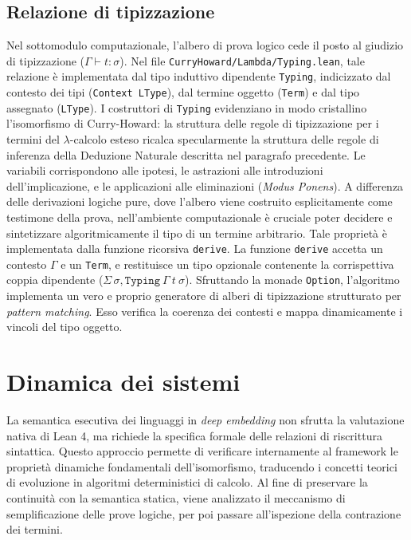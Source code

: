 \subsection{Relazione di tipizzazione}
Nel sottomodulo computazionale, l'albero di prova logico cede il posto al giudizio di tipizzazione (\(\Gamma \vdash t : \sigma\)). Nel file \texttt{CurryHoward/Lambda/Typing.lean}, tale relazione è implementata 
dal tipo induttivo dipendente \texttt{Typing}, indicizzato dal contesto dei tipi (\texttt{Context LType}), dal termine oggetto (\texttt{Term}) e dal tipo assegnato (\texttt{LType}). I costruttori di \texttt{Typing} 
evidenziano in modo cristallino l'isomorfismo di Curry-Howard: la struttura delle regole di tipizzazione per i termini del $\lambda$-calcolo esteso ricalca specularmente la struttura delle regole di inferenza della 
Deduzione Naturale descritta nel paragrafo precedente. Le variabili corrispondono alle ipotesi, le astrazioni alle introduzioni dell'implicazione, e le applicazioni alle eliminazioni (\emph{Modus Ponens}). A differenza 
delle derivazioni logiche pure, dove l'albero viene costruito esplicitamente come testimone della prova, nell'ambiente computazionale è cruciale poter decidere e sintetizzare algoritmicamente il tipo di un termine 
arbitrario. Tale proprietà è implementata dalla funzione ricorsiva \texttt{derive}. La funzione \texttt{derive} accetta un contesto \texttt{\(\Gamma\)} e un \texttt{Term}, e restituisce un tipo opzionale contenente la 
corrispettiva coppia dipendente (\(\Sigma \, \sigma, \mathtt{Typing}\ \Gamma\ t\ \sigma\)). Sfruttando la monade \texttt{Option}, l'algoritmo implementa un vero e proprio generatore di alberi di tipizzazione strutturato per 
\emph{pattern matching}. Esso verifica la coerenza dei contesti e mappa dinamicamente i vincoli del tipo oggetto.

\section{Dinamica dei sistemi}
La semantica esecutiva dei linguaggi in \emph{deep embedding} non sfrutta la valutazione nativa di Lean 4, ma richiede la specifica formale delle relazioni di riscrittura sintattica. Questo approccio permette di verificare 
internamente al framework le proprietà dinamiche fondamentali dell'isomorfismo, traducendo i concetti teorici di evoluzione in algoritmi deterministici di calcolo. Al fine di preservare la continuità con la semantica statica, 
viene analizzato il meccanismo di semplificazione delle prove logiche, per poi passare all'ispezione della contrazione dei termini.

